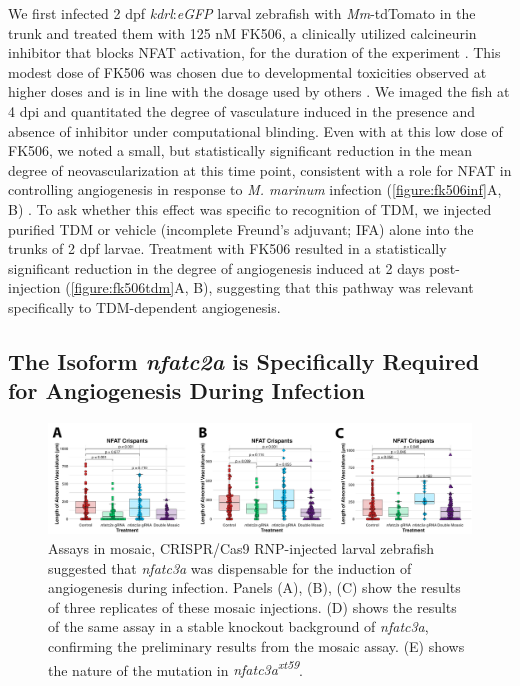 We first infected 2 dpf \textit{kdrl}:\textit{eGFP} larval zebrafish with \textit{Mm}-tdTomato in the trunk and treated them with 125 nM FK506, a clinically utilized calcineurin inhibitor that blocks NFAT activation, for the duration of the experiment \citep{Ellis1995}. This modest dose of FK506 was chosen due to developmental toxicities observed at higher doses and is in line with the dosage used by others \citep{Kujawski2014}. We imaged the fish at 4 dpi and quantitated the degree of vasculature induced in the presence and absence of inhibitor under computational blinding. Even with at this low dose of FK506, we noted a small, but statistically significant reduction in the mean degree of neovascularization at this time point, consistent with a role for NFAT in controlling angiogenesis in response to \textit{M. marinum} infection (\autoref{figure:fk506inf}A, B) \citep{Kujawski2014}. To ask whether this effect was specific to recognition of TDM, we injected purified TDM or vehicle (incomplete Freund's adjuvant; IFA) alone into the trunks of 2 dpf larvae. Treatment with FK506 resulted in a statistically significant reduction in the degree of angiogenesis induced at 2 days post-injection (\autoref{figure:fk506tdm}A, B), suggesting that this pathway was relevant specifically to TDM-dependent angiogenesis.

\subsection{The Isoform \textit{nfatc2a} is Specifically Required for Angiogenesis During Infection}

\begin{figure}
\centering
\includegraphics[width=\textwidth]{images/mosaicnfatc3a.pdf}
\caption{Assays in mosaic, CRISPR/Cas9 RNP-injected larval zebrafish suggested that \textit{nfatc3a} was dispensable for the induction of angiogenesis during infection. Panels (A), (B), (C) show the results of three replicates of these mosaic injections. (D) shows the results of the same assay in a stable knockout background of \textit{nfatc3a}, confirming the preliminary results from the mosaic assay. (E) shows the nature of the mutation in \textit{nfatc3a\textsuperscript{xt59}}.}
\label{figure:mosaic}
\end{figure}

